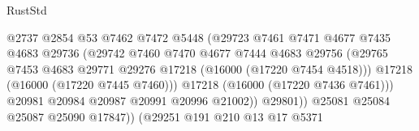 \begin{lexlean}{RustStd}
\begin{coremodule}
                                              @2737
                                              @2854
                                              @53
                                              @7462
                                              @7472
                                              @5448
                                              (@29723
                                                @7461
                                                @7471
                                                @4677
                                                @7435
                                                @4683
                                                @29736
                                                (@29742
                                                  @7460
                                                  @7470
                                                  @4677
                                                  @7444
                                                  @4683
                                                  @29756
                                                  (@29765
                                                    @7453
                                                    @4683
                                                    @29771
                                                    @29276
                                                    @17218
                                                    (@16000 (@17220 @7454 @4518)))
                                                  @17218
                                                  (@16000 (@17220 @7445 @7460)))
                                                @17218
                                                (@16000 (@17220 @7436 @7461)))
                                              @20981
                                              @20984
                                              @20987
                                              @20991
                                              @20996
                                              @21002))
                                          @29801))
                                      @25081
                                      @25084
                                      @25087
                                      @25090
                                      @17847))
                                  (@29251
                                    @191
                                    @210
                                    @13
                                    @17
                                    @5371

\end{coremodule}
\end{lexlean}
